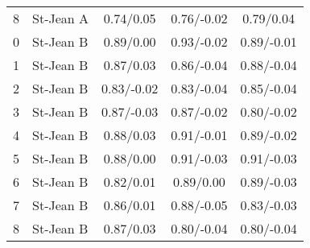 \begin{table}[H]
\begin{tabular}{l l c c c}
    8 & St-Jean A & 0.74/0.05 &  0.76/-0.02 & 0.79/0.04 \\
    0 & St-Jean B & 0.89/0.00 &  0.93/-0.02 &  0.89/-0.01 \\
    1 & St-Jean B & 0.87/0.03 &  0.86/-0.04 &  0.88/-0.04 \\
    2 & St-Jean B & 0.83/-0.02 &  0.83/-0.04 &  0.85/-0.04 \\
    3 & St-Jean B & 0.87/-0.03 &  0.87/-0.02 &  0.80/-0.02 \\
    4 & St-Jean B & 0.88/0.03 &  0.91/-0.01 &  0.89/-0.02 \\
    5 & St-Jean B & 0.88/0.00 &  0.91/-0.03 &  0.91/-0.03 \\
    6 & St-Jean B & 0.82/0.01 & 0.89/0.00 &  0.89/-0.03 \\
    7 & St-Jean B & 0.86/0.01 &  0.88/-0.05 &  0.83/-0.03 \\
    8 & St-Jean B & 0.87/0.03 &  0.80/-0.04 &  0.80/-0.04 \\
    \bottomrule
  \end{tabular}
\end{table}
